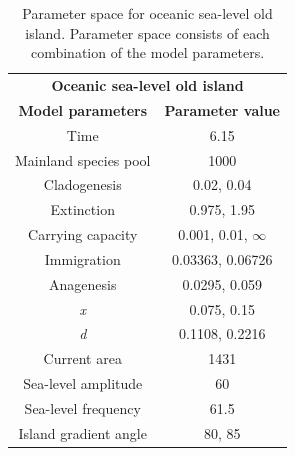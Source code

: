 \begin{table}[h]
    \centering
    \caption{Parameter space for oceanic sea-level old island. Parameter space consists of each combination of the model parameters.}
    \begin{tabular}{ c | c }
        \multicolumn{2}{c}{\textbf{Oceanic sea-level old island}} \\
        \textbf{Model parameters} & \textbf{Parameter value} \\ 
        \hline
        \hline
        Time & 6.15 \\
        \hline
        Mainland species pool & 1000 \\
        \hline
        Cladogenesis & 0.02, 0.04 \\
        \hline
        Extinction & 0.975, 1.95 \\
        \hline
        Carrying capacity & 0.001, 0.01, $\infty$ \\
        \hline
        Immigration & 0.03363, 0.06726 \\
        \hline
        Anagenesis & 0.0295, 0.059 \\
        \hline
        \textit{x} & 0.075, 0.15 \\
        \hline
        \textit{d} & 0.1108, 0.2216 \\
        \hline
        Current area & 1431 \\
        \hline
        Sea-level amplitude & 60 \\
        \hline
        Sea-level frequency & 61.5 \\
        \hline
        Island gradient angle & 80, 85 \\
    \end{tabular}
    \label{tab:oceanic_sea_level_old}
\end{table}

